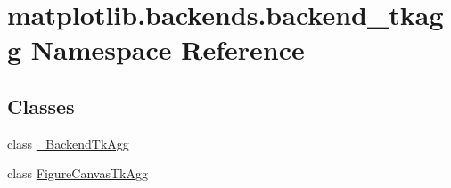 \hypertarget{namespacematplotlib_1_1backends_1_1backend__tkagg}{}\section{matplotlib.\+backends.\+backend\+\_\+tkagg Namespace Reference}
\label{namespacematplotlib_1_1backends_1_1backend__tkagg}
\subsection*{Classes}
\begin{DoxyCompactItemize}
\item 
class \hyperlink{classmatplotlib_1_1backends_1_1backend__tkagg_1_1__BackendTkAgg}{\+\_\+\+Backend\+Tk\+Agg}
\item 
class \hyperlink{classmatplotlib_1_1backends_1_1backend__tkagg_1_1FigureCanvasTkAgg}{Figure\+Canvas\+Tk\+Agg}
\end{DoxyCompactItemize}
